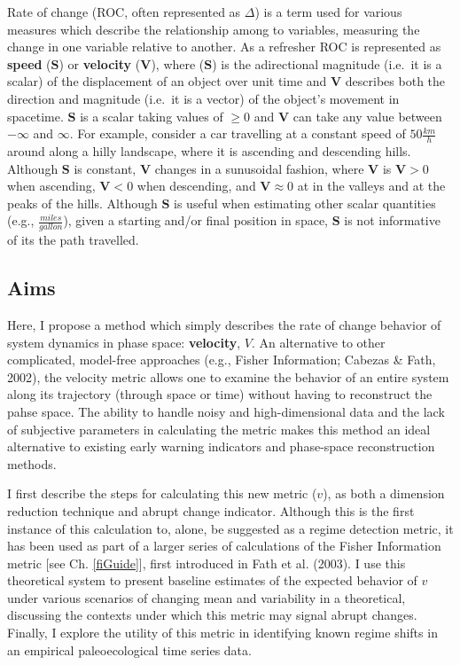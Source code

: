 \documentclass[12pt,twoside,openany]{reedthesis}
\begin{document}
Rate of change (ROC, often represented as \(\Delta\)) is a term used for various measures which describe the relationship among to variables, measuring the change in one variable relative to another. As a refresher ROC is represented as \textbf{speed} (\(\textbf{S}\)) or \textbf{velocity} (\(\textbf{V}\)), where (\(\textbf{S}\)) is the adirectional magnitude (i.e.~it is a scalar) of the displacement of an object over unit time and \(\textbf{V}\) describes both the direction and magnitude (i.e.~it is a vector) of the object's movement in spacetime. \(\textbf{S}\) is a scalar taking values of \(\geq0\) and \(\textbf{V}\) can take any value between \(-\infty\) and \(\infty\). For example, consider a car travelling at a constant speed of \(50\frac{km}{h}\) around along a hilly landscape, where it is ascending and descending hills. Although \(\textbf{S}\) is constant, \(\textbf{V}\) changes in a sunusoidal fashion, where \(\textbf{V}\) is \(\textbf{V}>0\) when ascending, \(\textbf{V}<0\) when descending, and \(\textbf{V}\approx0\) at in the valleys and at the peaks of the hills. Although \(\textbf{S}\) is useful when estimating other scalar quantities (e.g., \(\frac{miles}{gallon}\)), given a starting and/or final position in space, \(\textbf{S}\) is not informative of its the path travelled.

\hypertarget{aims-1}{%
\subsection{Aims}\label{aims-1}}

Here, I propose a method which simply describes the rate of change behavior of system dynamics in phase space: \textbf{velocity}, \(V\). An alternative to other complicated, model-free approaches (e.g., Fisher Information; Cabezas \& Fath, 2002), the velocity metric allows one to examine the behavior of an entire system along its trajectory
(through space or time) without having to reconstruct the pahse space. The ability to handle noisy and high-dimensional data and the lack of subjective parameters in calculating the metric makes this method an ideal alternative to existing early warning indicators and phase-space reconstruction methods.

I first describe the steps for calculating this new metric (\(v\)), as both a dimension reduction technique and abrupt change indicator. Although this is the first instance of this calculation to, alone, be suggested as a regime detection metric, it has been used as part of a larger series of calculations of the Fisher Information metric {[}see Ch. \ref{fiGuide}{]}, first introduced in Fath et al. (2003). I use this theoretical system to present baseline estimates of the expected behavior of \(v\) under various scenarios of changing mean and variability in a theoretical, discussing the contexts under which this metric may signal abrupt changes. Finally, I explore the utility of this metric in identifying known regime shifts in an empirical paleoecological time series data.
\end{document}

